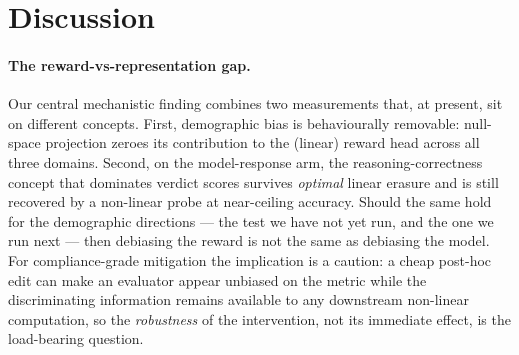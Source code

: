 \section{Discussion}
\label{sec:discussion}
\paragraph{The reward-vs-representation gap.} Our central mechanistic finding combines two measurements that,
at present, sit on different concepts. First, demographic bias is behaviourally removable: null-space
projection zeroes its contribution to the (linear) reward head across all three domains. Second, on the
model-response arm, the reasoning-correctness concept that dominates verdict scores survives \emph{optimal}
linear erasure and is still recovered by a non-linear probe at near-ceiling accuracy. Should the same hold for
the demographic directions --- the test we have not yet run, and the one we run next --- then debiasing the
reward is not the same as debiasing the model. For compliance-grade mitigation the implication is a caution: a
cheap post-hoc edit can make an evaluator appear unbiased on the metric while the discriminating information
remains available to any downstream non-linear computation, so the \emph{robustness} of the intervention, not
its immediate effect, is the load-bearing question.
